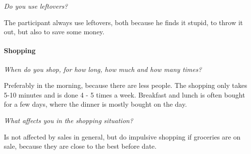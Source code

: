 \emph{Do you use leftovers?}

The participant always use leftovers, both because he finds it stupid, to throw it out, but also to save some money.
\paragraph{Shopping}
\emph{When do you shop, for how long, how much and how many times?}

Preferably in the morning, because there are less people. The shopping only takes 5-10 minutes and is done 4 - 5 times a week. Breakfast and lunch is often bought for a few days, where the dinner is mostly bought on the day.

\emph{What affects you in the shopping situation?}

Is not affected by sales in general, but do impulsive shopping if groceries are on sale, because they are close to the best before date.